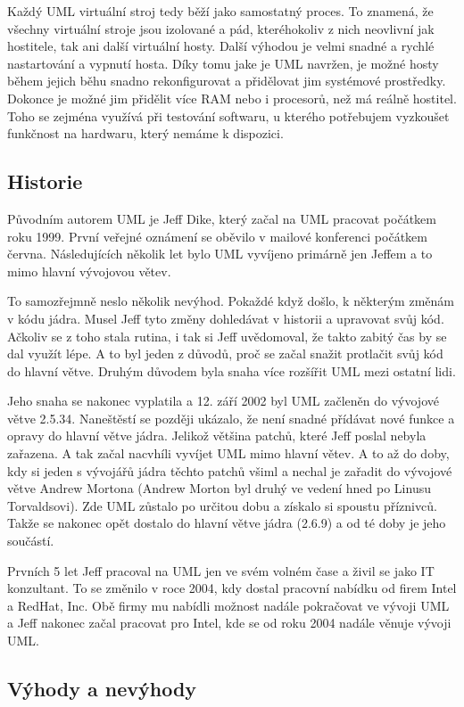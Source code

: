 Každý UML virtuální stroj tedy běží jako samostatný proces. To znamená, že všechny virtuální stroje jsou izolované a pád, kteréhokoliv z nich neovlivní jak hostitele, tak ani další virtuální hosty. Další výhodou je velmi snadné a rychlé nastartování a vypnutí hosta. Díky tomu jake je UML navržen, je možné hosty během jejich běhu snadno rekonfigurovat a přidělovat jim systémové prostředky. Dokonce je možné jim přidělit více RAM nebo i procesorů, než má reálně hostitel. Toho se zejména využívá při testování softwaru, u kterého potřebujem vyzkoušet funkčnost na hardwaru, který nemáme k dispozici.
\subsection{Historie}
Původním autorem UML je Jeff Dike, který začal na UML pracovat počátkem roku 1999. První veřejné oznámení se oběvilo v mailové konferenci počátkem června. Následujících několik let bylo UML vyvíjeno primárně jen Jeffem a to mimo hlavní vývojovou větev.

To samozřejmně neslo několik nevýhod. Pokaždé když došlo, k některým změnám v kódu jádra. Musel Jeff tyto změny dohledávat v historii a upravovat svůj kód. Ačkoliv se z toho stala rutina, i tak si Jeff uvědomoval, že takto zabitý čas by se dal využít lépe. A to byl jeden z důvodů, proč se začal snažit protlačit svůj kód do hlavní větve. Druhým důvodem byla snaha více rozšířit UML mezi ostatní lidi.

Jeho snaha se nakonec vyplatila a 12. září 2002 byl UML začleněn do vývojové větve 2.5.34. Naneštěstí se později ukázalo, že není snadné přídávat nové funkce a opravy do hlavní větve jádra. Jelikož většina patchů, které Jeff poslal nebyla zařazena. A tak začal nacvhíli vyvíjet UML mimo hlavní větev. A to až do doby, kdy si jeden s vývojářů jádra těchto patchů všiml a nechal je zařadit do vývojové větve Andrew Mortona (Andrew Morton byl druhý ve vedení hned po Linusu Torvaldsovi). Zde UML zůstalo po určitou dobu a získalo si spoustu příznivců. Takže se nakonec opět dostalo do hlavní větve jádra (2.6.9) a od té doby je jeho součástí.

Prvních 5 let Jeff pracoval na UML jen ve svém volném čase a živil se jako IT konzultant. To se změnilo v roce 2004, kdy dostal pracovní nabídku od firem Intel a RedHat, Inc. Obě firmy mu nabídli možnost nadále pokračovat ve vývoji UML a Jeff nakonec začal pracovat pro Intel, kde se od roku 2004 nadále věnuje vývoji UML.

\subsection{Výhody a nevýhody}
